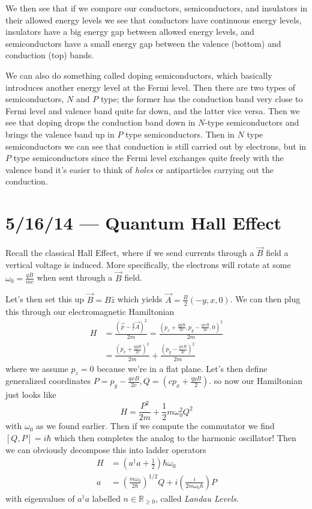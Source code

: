 \documentclass[10pt]{report}
\begin{document}
We then see that if we compare our conductors, semiconductors, and insulators in their allowed energy levels we see that conductors have continuous energy levels, insulators have a big energy gap between allowed energy levels, and semiconductors have a small energy gap between the valence (bottom) and conduction (top) bands. 

We can also do something called doping semiconductors, which basically introduces another energy level at the Fermi level. Then there are two types of semiconductors, $N$ and $P$ type; the former has the conduction band very close to Fermi level and valence band quite far down, and the latter vice versa. Then we see that doping drops the conduction band down in $N$-type semiconductors and brings the valence band up in $P$ type semiconductors. Then in $N$ type semiconductors we can see that conduction is still carried out by electrons, but in $P$ type semiconductors since the Fermi level exchanges quite freely with the valence band it's easier to think of \emph{holes} or antiparticles carrying out the conduction.

\chapter{5/16/14 --- Quantum Hall Effect}

Recall the classical Hall Effect, where if we send currents through a $\vec{B}$ field a vertical voltage is induced. More specifically, the electrons will rotate at some $\omega_0 = \frac{qB}{mc}$ when sent through a $\vec{B}$ field.

Let's then set this up $\vec{B} = B\hat{z}$ which yields $\vec{A} = \frac{B}{2}\left( -y,x,0 \right)$. We can then plug this through our electromagnetic Hamiltonian
\begin{align}
    H &= \frac{\left( \vec{p} - \frac{q}{c}\vec{A} \right)^2}{2m} = \frac{\left( p_x + \frac{qyB}{2c}, p_y - \frac{qxB}{2c},0 \right)^2}{2m}\\
    &= \frac{\left( p_x + \frac{qyB}{2c} \right)^2}{2m} + \frac{\left( p_y - \frac{qxB}{2c} \right)^2}{2m}
\end{align}
where we assume $p_z = 0$ because we're in a flat plane. Let's then define generalized coordinates $P = p_y - \frac{qxB}{2c}, Q = \left(cp_x + \frac{qyB}{2}\right)$. so now our Hamiltonian just looks like
\begin{equation}
    H = \frac{P^2}{2m} + \frac{1}{2}m\omega_0^2Q^2
\end{equation}
with $\omega_0$ as we found earlier. Then if we compute the commutator we find $\left[ Q,P \right] = i\hbar$ which then completes the analog to the harmonic oscillator! Then we can obviously decompose this into ladder operators
\begin{align}
    H &= \left( a^\dagger a + \frac{1}{2} \right)\hbar \omega_0\\
    a &= \left( \frac{m\omega_0}{2\hbar} \right)^{1/2}Q + i\left( \frac{i}{2m\omega_0\hbar} \right)P
\end{align}
with eigenvalues of $a^\dagger a$ labelled $n \in \mathbb{R}_{\geq 0}$, called \emph{Landau Levels}. 
\end{document}

